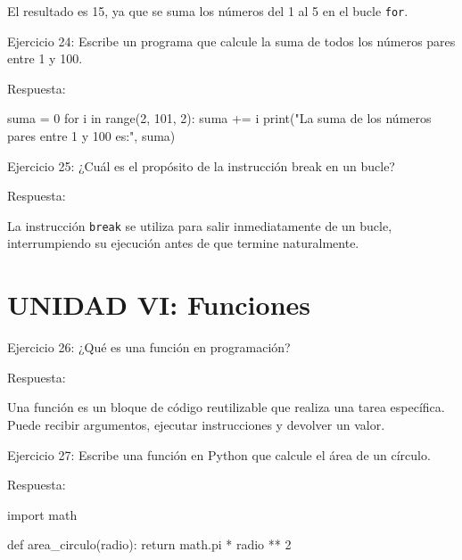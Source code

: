 \documentclass[
  a4paper,
  onepage,
  openany]{scrreprt}
\newenvironment{Shaded}{\begin{snugshade}}{\end{snugshade}}
\newcommand{\BuiltInTok}[1]{\textcolor[rgb]{0.00,0.23,0.31}{#1}}
\newcommand{\ControlFlowTok}[1]{\textcolor[rgb]{0.00,0.23,0.31}{#1}}
\newcommand{\DecValTok}[1]{\textcolor[rgb]{0.68,0.00,0.00}{#1}}
\newcommand{\ImportTok}[1]{\textcolor[rgb]{0.00,0.46,0.62}{#1}}
\newcommand{\KeywordTok}[1]{\textcolor[rgb]{0.00,0.23,0.31}{#1}}
\newcommand{\NormalTok}[1]{\textcolor[rgb]{0.00,0.23,0.31}{#1}}
\newcommand{\OperatorTok}[1]{\textcolor[rgb]{0.37,0.37,0.37}{#1}}
\newcommand{\StringTok}[1]{\textcolor[rgb]{0.13,0.47,0.30}{#1}}
\begin{document}
El resultado es 15, ya que se suma los números del 1 al 5 en el bucle
\texttt{for}.

Ejercicio 24: Escribe un programa que calcule la suma de todos los
números pares entre 1 y 100.

Respuesta:

\begin{Shaded}
\begin{Highlighting}[]
\NormalTok{suma }\OperatorTok{=} \DecValTok{0}
\ControlFlowTok{for}\NormalTok{ i }\KeywordTok{in} \BuiltInTok{range}\NormalTok{(}\DecValTok{2}\NormalTok{, }\DecValTok{101}\NormalTok{, }\DecValTok{2}\NormalTok{):}
\NormalTok{    suma }\OperatorTok{+=}\NormalTok{ i}
\BuiltInTok{print}\NormalTok{(}\StringTok{"La suma de los números pares entre 1 y 100 es:"}\NormalTok{, suma)}
\end{Highlighting}
\end{Shaded}

Ejercicio 25: ¿Cuál es el propósito de la instrucción break en un bucle?

Respuesta:

La instrucción \texttt{break} se utiliza para salir inmediatamente de un
bucle, interrumpiendo su ejecución antes de que termine naturalmente.

\hypertarget{unidad-vi-funciones}{%
\section{UNIDAD VI: Funciones}\label{unidad-vi-funciones}}

Ejercicio 26: ¿Qué es una función en programación?

Respuesta:

Una función es un bloque de código reutilizable que realiza una tarea
específica. Puede recibir argumentos, ejecutar instrucciones y devolver
un valor.

Ejercicio 27: Escribe una función en Python que calcule el área de un
círculo.

Respuesta:

\begin{Shaded}
\begin{Highlighting}[]
\ImportTok{import}\NormalTok{ math}

\KeywordTok{def}\NormalTok{ area\_circulo(radio):}
\ControlFlowTok{return}\NormalTok{ math.pi }\OperatorTok{*}\NormalTok{ radio }\OperatorTok{**} \DecValTok{2}
\end{Highlighting}
\end{Shaded}
\end{document}
